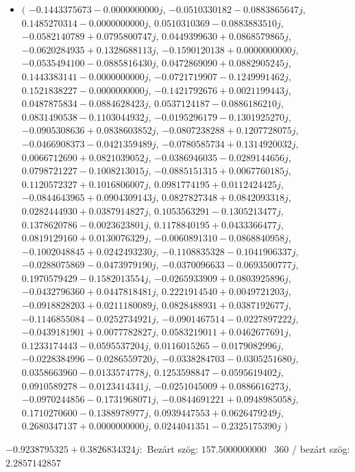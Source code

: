 \documentclass[14pt,a4paper]{article}
\begin{document}
\begin{itemize}
\item
$\big($
$-0.1443375673-0.0000000000j$, $-0.0510330182-0.0883865647j$, $0.1485270314-0.0000000000j$, $0.0510310369-0.0883883510j$, $-0.0582140789+0.0795800747j$, $0.0449399630+0.0868579865j$, $-0.0620284935+0.1328688113j$, $-0.1590120138+0.0000000000j$, $-0.0535494100-0.0885816430j$, $0.0472869090+0.0882905245j$, $0.1443383141-0.0000000000j$, $-0.0721719907-0.1249991462j$, $0.1521838227-0.0000000000j$, $-0.1421792676+0.0021199443j$, $0.0487875834-0.0884628423j$, $0.0537124187-0.0886186210j$, $0.0831490538-0.1103044932j$, $-0.0195296179-0.1301925270j$, $-0.0905308636+0.0838603852j$, $-0.0807238288+0.1207728075j$, $-0.0466908373-0.0421359489j$, $-0.0780585734+0.1314920032j$, $0.0066712690+0.0821039052j$, $-0.0386946035-0.0289144656j$, $0.0798721227-0.1008213015j$, $-0.0885151315+0.0067760185j$, $0.1120572327+0.1016806007j$, $0.0981774195+0.0112424425j$, $-0.0844643965+0.0904309143j$, $0.0827827348+0.0842093318j$, $0.0282444930+0.0387914827j$, $0.1053563291-0.1305213477j$, $0.1378620786-0.0023623801j$, $0.1178840195+0.0433366477j$, $0.0819129160+0.0130076329j$, $-0.0060891310-0.0868840958j$, $-0.1002048845+0.0242493230j$, $-0.1108835328-0.1041906337j$, $-0.0288075869-0.0473979190j$, $-0.0370096633-0.0693500777j$, $0.1970579429-0.1582013554j$, $-0.0265933909+0.0803925896j$, $-0.0432796360+0.0447818481j$, $0.2221914540+0.0049721203j$, $-0.0918828203+0.0211180089j$, $0.0828488931+0.0387192677j$, $-0.1146855084-0.0252734921j$, $-0.0901467514-0.0227897222j$, $-0.0439181901+0.0077782827j$, $0.0583219011+0.0462677691j$, $0.1233174443-0.0595537204j$, $0.0116015265-0.0179082996j$, $-0.0228384996-0.0286559720j$, $-0.0338284703-0.0305251680j$, $0.0358663960-0.0133574778j$, $0.1253598847-0.0595619402j$, $0.0910589278-0.0123414341j$, $-0.0251045009+0.0886616273j$, $-0.0970244856-0.1731968071j$, $-0.0844691221+0.0948985058j$, $0.1710270600-0.1388978977j$, $0.0939447553+0.0626479249j$, $0.2680347137+0.0000000000j$, $0.0244041351-0.2325175390j$
$\big)$
\end{itemize}
$-0.9238795325+0.3826834324j$:\
Bezárt szög: $157.5000000000$ \
360 / bezárt szög: $2.2857142857$\
\end{document}
